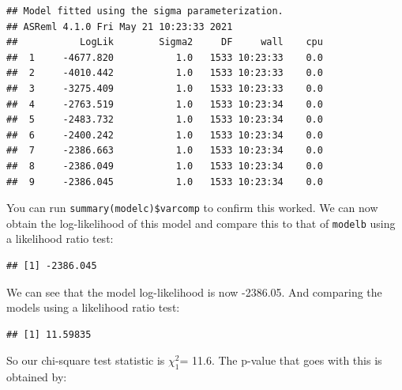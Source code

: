 \documentclass[
  12pt,
]{book}
\newenvironment{Shaded}{\begin{snugshade}}{\end{snugshade}}
\newcommand{\DecValTok}[1]{\textcolor[rgb]{0.00,0.00,0.81}{#1}}
\newcommand{\FunctionTok}[1]{\textcolor[rgb]{0.00,0.00,0.00}{#1}}
\newcommand{\NormalTok}[1]{#1}
\newcommand{\SpecialCharTok}[1]{\textcolor[rgb]{0.00,0.00,0.00}{#1}}
\begin{document}
\begin{verbatim}
## Model fitted using the sigma parameterization.
## ASReml 4.1.0 Fri May 21 10:23:33 2021
##           LogLik        Sigma2     DF     wall    cpu
##  1     -4677.820           1.0   1533 10:23:33    0.0
##  2     -4010.442           1.0   1533 10:23:33    0.0
##  3     -3275.409           1.0   1533 10:23:33    0.0
##  4     -2763.519           1.0   1533 10:23:34    0.0
##  5     -2483.732           1.0   1533 10:23:34    0.0
##  6     -2400.242           1.0   1533 10:23:34    0.0
##  7     -2386.663           1.0   1533 10:23:34    0.0
##  8     -2386.049           1.0   1533 10:23:34    0.0
##  9     -2386.045           1.0   1533 10:23:34    0.0
\end{verbatim}

You can run \texttt{summary(modelc)\$varcomp} to confirm this worked. We can now obtain the log-likelihood of this model and compare this to that of \texttt{modelb} using a likelihood ratio test:

\begin{Shaded}
\end{Shaded}

\begin{verbatim}
## [1] -2386.045
\end{verbatim}

We can see that the model log-likelihood is now -2386.05.
And comparing the models using a likelihood ratio test:

\begin{Shaded}
\end{Shaded}

\begin{verbatim}
## [1] 11.59835
\end{verbatim}

So our chi-square test statistic is \(\chi^2_1\)= 11.6.
The p-value that goes with this is obtained by:

\begin{Shaded}
\end{Shaded}
\end{document}
